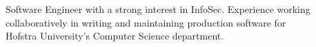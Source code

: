 

\begin{cvparagraph}

Software Engineer with a strong interest in InfoSec. Experience working collaboratively in writing and maintaining production software for \\ Hofstra
University’s Computer Science department.

\end{cvparagraph}

